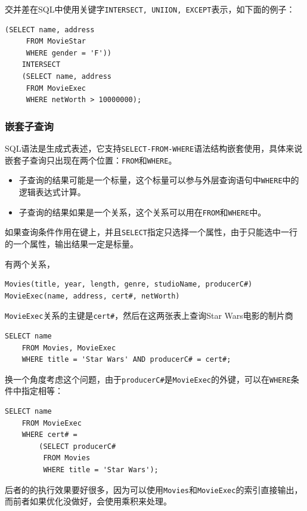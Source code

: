 交并差在SQL中使用关键字\texttt{INTERSECT, UNIION, EXCEPT}表示，如下面的例子：
\begin{lstlisting}[style=verbose]
    (SELECT name, address
     FROM MovieStar
     WHERE gender = 'F'))
    INTERSECT
    (SELECT name, address
     FROM MovieExec
     WHERE netWorth > 10000000);
\end{lstlisting}

\subsubsection*{嵌套子查询}

SQL语法是生成式表述，它支持\texttt{SELECT-FROM-WHERE}语法结构嵌套使用，具体来说嵌套子查询只出现在两个位置：\texttt{FROM}和\texttt{WHERE}。

\begin{itemize}
    \item 子查询的结果可能是一个标量，这个标量可以参与外层查询语句中\texttt{WHERE}中的逻辑表达式计算。
    \item 子查询的结果如果是一个关系，这个关系可以用在\texttt{FROM}和\texttt{WHERE}中。
\end{itemize}

如果查询条件作用在键上，并且\texttt{SELECT}指定只选择一个属性，由于只能选中一行的一个属性，输出结果一定是标量。

\begin{example}
    有两个关系，
\begin{lstlisting}[style=verbose]
Movies(title, year, length, genre, studioName, producerC#)
MovieExec(name, address, cert#, netWorth)
\end{lstlisting}

\texttt{MovieExec}关系的主键是\texttt{cert\#}，然后在这两张表上查询Star Wars电影的制片商
\begin{lstlisting}[style=verbose]
    SELECT name
    FROM Movies, MovieExec
    WHERE title = 'Star Wars' AND producerC# = cert#;
\end{lstlisting}

换一个角度考虑这个问题，由于\texttt{producerC\#}是\texttt{MovieExec}的外键，可以在\texttt{WHERE}条件中指定相等：
\begin{lstlisting}[style=verbose]
    SELECT name
    FROM MovieExec
    WHERE cert# =
        (SELECT producerC#
         FROM Movies
         WHERE title = 'Star Wars');
\end{lstlisting}

后者的的执行效果要好很多，因为可以使用\texttt{Movies}和\texttt{MovieExec}的索引直接输出，而前者如果优化没做好，会使用乘积来处理。
\end{example}

